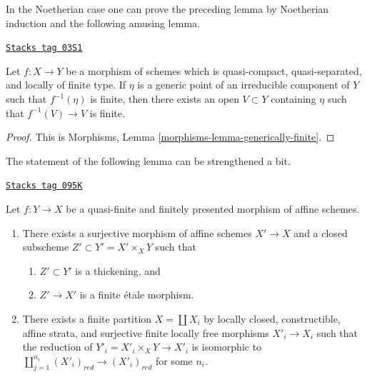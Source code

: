 In the Noetherian case one can prove the preceding lemma by
Noetherian induction and the following amusing lemma.

\begin{lemma}
\label{etale-cohomology-lemma-generically-finite}
\href{https://stacks.math.columbia.edu/tag/03S1}{\texttt{Stacks tag 03S1}}

Let $f: X \to Y$ be a morphism of schemes which is quasi-compact,
quasi-separated, and locally of finite type. If $\eta$ is a generic point
of an irreducible component of $Y$ such that $f^{-1}(\eta)$ is finite, then
there exists an open $V \subset Y$ containing $\eta$ such that
$f^{-1}(V) \to V$ is finite.
\end{lemma}

\begin{proof}
This is Morphisms, Lemma \ref{morphisms-lemma-generically-finite}.
\end{proof}

The statement of the following lemma can be strengthened a bit.

\begin{lemma}
\label{etale-cohomology-lemma-decompose-quasi-finite-morphism}
\href{https://stacks.math.columbia.edu/tag/095K}{\texttt{Stacks tag 095K}}

Let $f : Y \to X$ be a quasi-finite and finitely presented
morphism of affine schemes.
\begin{enumerate}
\item There exists a surjective morphism of affine schemes $X' \to X$ and a
closed subscheme $Z' \subset Y' = X' \times_X Y$ such that
\begin{enumerate}
\item $Z' \subset Y'$ is a thickening, and
\item $Z' \to X'$ is a finite \'etale morphism.
\end{enumerate}
\item There exists a finite partition $X = \coprod X_i$ by
locally closed, constructible, affine strata, and surjective finite locally
free morphisms $X'_i \to X_i$ such that the reduction of
$Y'_i = X'_i \times_X Y \to X'_i$ is isomorphic to
$\coprod_{j = 1}^{n_i} (X'_i)_{red} \to (X'_i)_{red}$ for some $n_i$.
\end{enumerate}
\end{lemma}

